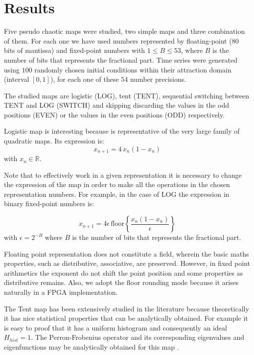 \section{Results}\label{sec:resultados}

Five pseudo chaotic maps were studied, two simple maps and three combination of them.
For each one we have used numbers represented by floating-point (80 bits of mantissa) and  fixed-point numbers with $1\leq B \leq 53$, where $B$ is the number of bits that represents the fractional part.
Time series were generated using $100$ randomly chosen initial conditions within their attraction domain (interval $[0,1]$), for each one of these $54$ number precisions.

The studied maps are logistic (LOG), tent (TENT), sequential switching between TENT and LOG (SWITCH) and skipping discarding the values in the odd positions (EVEN) or the values in the even positions (ODD) respectively.

Logistic map is interesting because is representative of the very large family of quadratic maps.
Its expression is:
%
\begin{equation}\label{eq:logimap}
x_{n+1}=4\,x_{n}(1-x_{n}) 
\end{equation}
%
with $x_n \in \mathbb{R}$.

Note that to effectively work in a given representation it is necessary to change the expression of the map in order to make all the operations in the chosen representation numbers. For example, in the case of LOG the expression in binary fixed-point numbers is:

\begin{equation}\label{eq:logimapB2}
x_{n+1}=4 \epsilon \,\text{floor}\left\{\frac{x_n(1-x_n)}{\epsilon}\right\}
\end{equation}
%
with $\epsilon = 2^{-B}$ where $B$ is the number of bits that represents the fractional part.

Floating point representation does not constitute a field, wherein the basic maths properties, such as distributive, associative, are preserved.
However, in fixed point arithmetics the exponent do not shift the point position and some properties as distributive remains.
Also, we adopt the floor rounding mode because it arises naturally in a FPGA implementation.

The Tent map has been extensively studied in the literature because theoretically it has nice statistical properties that can be analytically obtained.
For example it is easy to proof that it has a uniform histogram and consequently an ideal $H_{hist}=1$.
The Perron-Frobenius operator and its corresponding eigenvalues and eigenfunctions may be analytically obtained for this map \cite{Lasota1994}.

